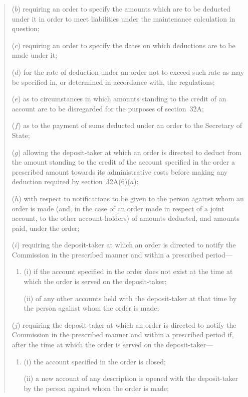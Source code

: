 \documentclass[12pt,a4paper]{article}
\begin{document}
\begin{quotation}
\begin{enumerate}
($b$) requiring an order to specify the amounts which are to be deducted under it
in order to meet liabilities under the maintenance calculation in question;

($c$) requiring an order to specify the dates on which deductions are to be made
under it;

($d$) for the rate of deduction under an order not to exceed such rate as may be
specified in, or determined in accordance with, the regulations;

($e$) as to circumstances in which amounts standing to the credit of an account
are to be disregarded for the purposes of section~32A;

($f$) as to the payment of sums deducted under an order to the Secretary of
State;

($g$) allowing the deposit-taker at which an order is directed to deduct from the
amount standing to the credit of the account specified in the order a prescribed
amount towards its administrative costs before making any deduction required
by section~32A(6)($a$);

($h$) with respect to notifications to be given to the person against whom an order
is made (and, in the case of an order made in respect of a joint account, to the
other account-holders) of amounts deducted, and amounts paid, under the
order;

($i$) requiring the deposit-taker at which an order is directed to notify the
Commission in the prescribed manner and within a prescribed period---
\begin{enumerate}\item[]
(i)
if the account specified in the order does not exist at the time at which
the order is served on the deposit-taker;

(ii)
of any other accounts held with the deposit-taker at that time by the
person against whom the order is made;
\end{enumerate}

($j$) requiring the deposit-taker at which an order is directed to notify the
Commission in the prescribed manner and within a prescribed period
if, after the time at which the order is served on the deposit-taker---
\begin{enumerate}\item[]
(i) the account specified in the order is closed;

(ii) a new account of any description is opened with the deposit-taker by
the person against whom the order is made;
\end{enumerate}


\end{enumerate}
\end{quotation}
\end{document}
